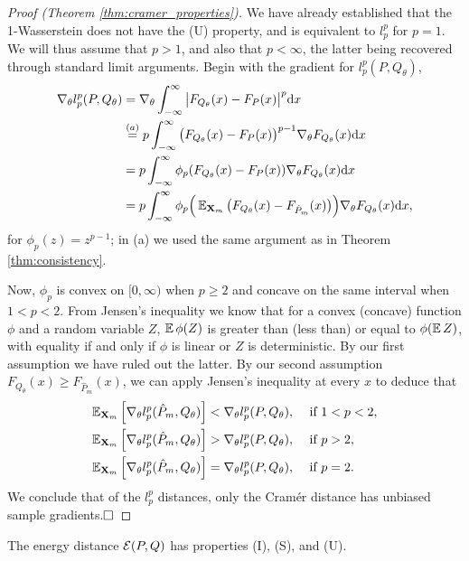 \documentclass{article}
\def \ldive {l}
\def \dx {\textrm{d} x}
\def \gradtheta {{\grad_\theta}}
\def \batch {\mathbf{X}_m}
\begin{document}
\begin{proof}[Proof (Theorem \ref{thm:cramer_properties})]
We have already established that the 1-Wasserstein does not have the (U) property, and is equivalent to $\ldive_p^p$ for $p = 1$. We will thus assume that $p > 1$, and also that $p < \infty$, the latter being recovered through standard limit arguments. Begin with the gradient for $\ldive_p^p(P, {Q_\theta})$,
\begin{align*}
\gradtheta \ldive_p^p(P, {Q_\theta}) &= \gradtheta \int_{-\infty}^{\infty} \big | F_{Q_\theta}(x) - F_P(x) \big |^p \dx \\
&\overset{(a)}{=} p \int_{-\infty}^{\infty} \big (F_{Q_\theta}(x) - F_P(x) \big )^{p-1} \gradtheta F_{Q_\theta}(x) \dx \\
&= p \int_{-\infty}^{\infty} \phi_p(F_{Q_\theta}(x) - F_P(x)) \gradtheta F_{Q_\theta}(x) \dx \\
&= p \int_{-\infty}^{\infty} \phi_p\Big (\expects_{\batch} \big ( F_{Q_\theta}(x) - F_{\hat P_m}(x) \big ) \Big ) \gradtheta F_{Q_\theta}(x) \dx,
\end{align*}
for $\phi_p(z) = z^{p-1}$; in (a) we used the same argument as in Theorem \ref{thm:consistency}. 

Now, $\phi_p$ is convex on $[0, \infty)$ when $p \ge 2$ and concave on the same interval when $1 < p < 2$. From Jensen's inequality we know that for a convex (concave) function $\phi$ and a random variable $Z$, $\expect \phi(Z)$ is greater than (less than) or equal to $\phi(\expects Z)$, with equality if and only if $\phi$ is linear or $Z$ is deterministic. By our first assumption we have ruled out the latter. By our second assumption $F_{Q_\theta}(x) \ge F_{\hat P_m}(x)$, we can apply Jensen's inequality at every $x$ to deduce that
\begin{align*}
 \expects_{\batch} \left[ \gradtheta \ldive_p^p(\hat P_m, {Q_\theta}) \right] < \gradtheta \ldive_p^p(P, {Q_\theta}),\ \quad & \text{if $1 < p < 2$},\\
 \expects_{\batch} \left[ \gradtheta \ldive_p^p(\hat P_m, {Q_\theta}) \right] > \gradtheta \ldive_p^p(P, {Q_\theta}),\ \quad & \text{if $p > 2$},\\
 \expects_{\batch} \left[ \gradtheta \ldive_p^p(\hat P_m, {Q_\theta}) \right] = \gradtheta \ldive_p^p(P, {Q_\theta}),\ \quad & \text{if $p = 2$}.
\end{align*} 
We conclude that of the $l_p^p$ distances, only the Cram\'er distance has unbiased sample gradients.$\hfill \square$
\end{proof}

\begin{prop}
The energy distance $\mathcal{E}(P, Q)$ has properties (I), (S), and (U).
\end{prop}
\end{document}
